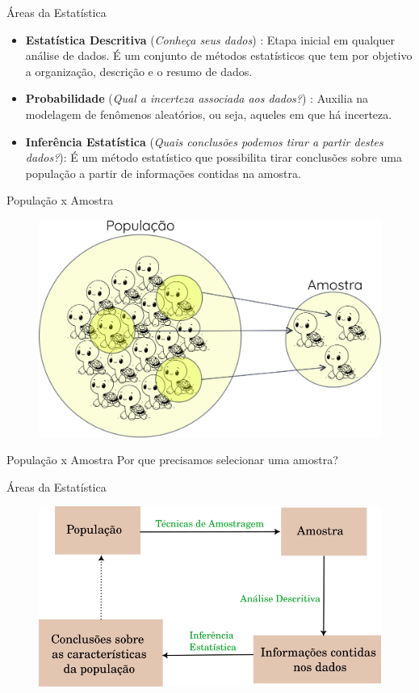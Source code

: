 \documentclass{beamer}
\begin{document}
\begin{frame}{Áreas da Estatística}
\begin{itemize}
    \item \textbf{Estatística Descritiva} (\textit{Conheça seus dados}) : Etapa inicial em qualquer análise de dados. É um conjunto de métodos estatísticos que tem por objetivo a organização, descrição e o resumo de dados. 
\pause 
    \item \textbf{Probabilidade} (\textit{Qual a incerteza associada aos dados?}) : Auxilia na modelagem de fenômenos aleatórios, ou seja, aqueles em que há incerteza.
\pause
    \item \textbf{Inferência Estatística} (\textit{Quais conclusões podemos tirar a partir destes dados?}): É um método estatístico que possibilita tirar conclusões sobre uma população a partir de informações contidas na amostra.
\end{itemize}

\end{frame}
\begin{frame}{População x Amostra}

\begin{figure}
    \centering
    \includegraphics[width=0.7\linewidth]{figures/pop_sample.png}
\end{figure}
\end{frame}

\begin{frame}{População x Amostra}
    Por que precisamos selecionar uma amostra?
\end{frame}
\begin{frame}{Áreas da Estatística}
    \begin{figure}
        \centering
        \includegraphics[width=0.8\linewidth]{figures/int_1.png}
    \end{figure}
\end{frame}
\end{document}

